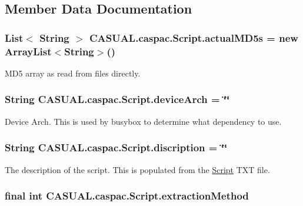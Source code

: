 \subsection{Member Data Documentation}
\hypertarget{class_c_a_s_u_a_l_1_1caspac_1_1_script_a2cb67bdbfa6bb794cd55bdbf0208b69f}{
\subsubsection[{actual\-M\-D5s}]{\setlength{\rightskip}{0pt plus 5cm}List$<$ String $>$ C\-A\-S\-U\-A\-L.\-caspac.\-Script.\-actual\-M\-D5s = new Array\-List$<$String$>$()}}\label{class_c_a_s_u_a_l_1_1caspac_1_1_script_a2cb67bdbfa6bb794cd55bdbf0208b69f}
M\-D5 array as read from files directly. \hypertarget{class_c_a_s_u_a_l_1_1caspac_1_1_script_ad279923c361a980ee47bf805e546e6b3}{
\subsubsection[{device\-Arch}]{\setlength{\rightskip}{0pt plus 5cm}String C\-A\-S\-U\-A\-L.\-caspac.\-Script.\-device\-Arch = \char`\"{}\char`\"{}}}\label{class_c_a_s_u_a_l_1_1caspac_1_1_script_ad279923c361a980ee47bf805e546e6b3}
Device Arch. This is used by busybox to determine what dependency to use. \hypertarget{class_c_a_s_u_a_l_1_1caspac_1_1_script_af7d466f393929435e6a6ccecacc324de}{
\subsubsection[{discription}]{\setlength{\rightskip}{0pt plus 5cm}String C\-A\-S\-U\-A\-L.\-caspac.\-Script.\-discription = \char`\"{}\char`\"{}}}\label{class_c_a_s_u_a_l_1_1caspac_1_1_script_af7d466f393929435e6a6ccecacc324de}
The description of the script. This is populated from the \hyperlink{class_c_a_s_u_a_l_1_1caspac_1_1_script}{Script} T\-X\-T file. \hypertarget{class_c_a_s_u_a_l_1_1caspac_1_1_script_ae040eb95ecb947f2c0263a3456205f98}{
\subsubsection[{extraction\-Method}]{\setlength{\rightskip}{0pt plus 5cm}final int C\-A\-S\-U\-A\-L.\-caspac.\-Script.\-extraction\-Method}}\label{class_c_a_s_u_a_l_1_1caspac_1_1_script_ae040eb95ecb947f2c0263a3456205f98}
